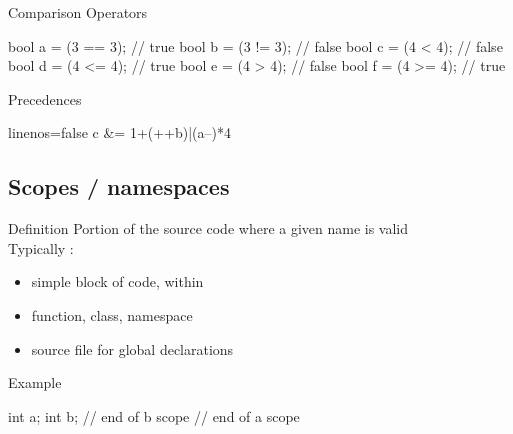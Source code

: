 \begin{frame}[fragile]
  \begin{block}{Comparison Operators}
    \begin{cppcode*}{}
      bool a = (3 == 3);  // true
      bool b = (3 != 3);  // false
      bool c = (4 <  4);  // false
      bool d = (4 <= 4);  // true
      bool e = (4 >  4);  // false
      bool f = (4 >= 4);  // true
    \end{cppcode*}
  \end{block}
  \pause
  \begin{block}{Precedences }
    \begin{cppcode*}{linenos=false}
      c &= 1+(++b)|(a--)*4%
    \end{cppcode*}
  \end{block}
\end{frame}

\subsection[NS]{Scopes / namespaces}

\begin{frame}[fragile]
  \begin{block}{Definition}
    Portion of the source code where a given name is valid \\
    Typically :
    \begin{itemize}
    \item simple block of code, within \texttt{{}}
    \item function, class, namespace
    \item source file for global declarations
    \end{itemize}
  \end{block}
  \begin{exampleblock}{Example}
    \begin{cppcode*}{}
      { int a;
        { int b;
        } // end of b scope
      } // end of a scope
    \end{cppcode*}
  \end{exampleblock}
\end{frame}


